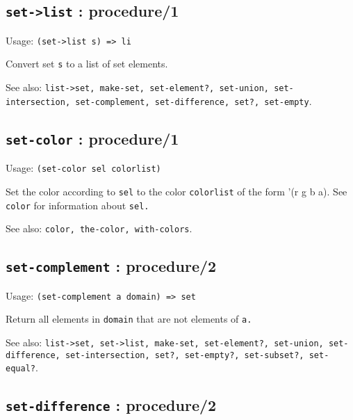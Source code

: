 \documentclass[
]{article}
\newcommand{\passthrough}[1]{#1}
\begin{document}
\hypertarget{set-list-procedure1-1}{%
\subsection{\texorpdfstring{\texttt{set-\textgreater{}list} :
procedure/1}{set-\textgreater list : procedure/1}}\label{set-list-procedure1-1}}

Usage: \passthrough{\lstinline!(set->list s) => li!}

Convert set \passthrough{\lstinline!s!} to a list of set elements.

See also:
\passthrough{\lstinline!list->set, make-set, set-element?, set-union, set-intersection, set-complement, set-difference, set?, set-empty!}.

\hypertarget{set-color-procedure1-1}{%
\subsection{\texorpdfstring{\texttt{set-color} :
procedure/1}{set-color : procedure/1}}\label{set-color-procedure1-1}}

Usage: \passthrough{\lstinline!(set-color sel colorlist)!}

Set the color according to \passthrough{\lstinline!sel!} to the color
\passthrough{\lstinline!colorlist!} of the form '(r g b a). See
\passthrough{\lstinline!color!} for information about
\passthrough{\lstinline!sel.!}

See also: \passthrough{\lstinline!color, the-color, with-colors!}.

\hypertarget{set-complement-procedure2-1}{%
\subsection{\texorpdfstring{\texttt{set-complement} :
procedure/2}{set-complement : procedure/2}}\label{set-complement-procedure2-1}}

Usage: \passthrough{\lstinline!(set-complement a domain) => set!}

Return all elements in \passthrough{\lstinline!domain!} that are not
elements of \passthrough{\lstinline!a.!}

See also:
\passthrough{\lstinline!list->set, set->list, make-set, set-element?, set-union, set-difference, set-intersection, set?, set-empty?, set-subset?, set-equal?!}.

\hypertarget{set-difference-procedure2-1}{%
\subsection{\texorpdfstring{\texttt{set-difference} :
procedure/2}{set-difference : procedure/2}}\label{set-difference-procedure2-1}}
\end{document}
